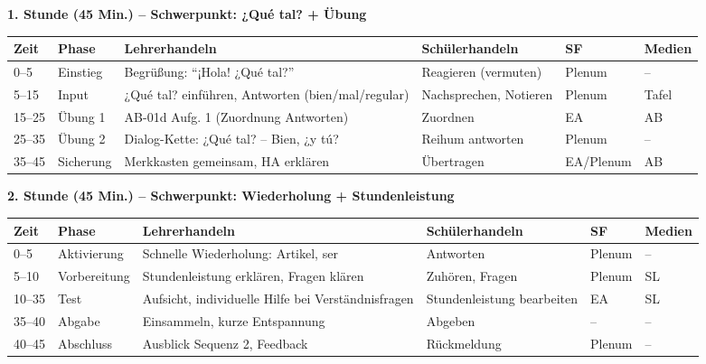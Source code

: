 \documentclass[11pt,a4paper]{article}
\begin{document}
\textbf{1. Stunde (45 Min.) -- Schwerpunkt: ¿Qué tal? + Übung}

\begin{longtable}{|p{1cm}|p{1.5cm}|p{4cm}|p{3cm}|p{2cm}|p{2cm}|}
\hline
\textbf{Zeit} & \textbf{Phase} & \textbf{Lehrerhandeln} & \textbf{Schülerhandeln} & \textbf{SF} & \textbf{Medien} \\
\hline
\endhead

0--5 & Einstieg & Begrüßung: ``¡Hola! ¿Qué tal?'' & Reagieren (vermuten) & Plenum & -- \\
\hline

5--15 & Input & ¿Qué tal? einführen, Antworten (bien/mal/regular) & Nachsprechen, Notieren & Plenum & Tafel \\
\hline

15--25 & Übung 1 & AB-01d Aufg. 1 (Zuordnung Antworten) & Zuordnen & EA & AB \\
\hline

25--35 & Übung 2 & Dialog-Kette: ¿Qué tal? -- Bien, ¿y tú? & Reihum antworten & Plenum & -- \\
\hline

35--45 & Sicherung & Merkkasten gemeinsam, HA erklären & Übertragen & EA/Plenum & AB \\
\hline
\end{longtable}

\vspace{1em}

\textbf{2. Stunde (45 Min.) -- Schwerpunkt: Wiederholung + Stundenleistung}

\begin{longtable}{|p{1cm}|p{1.5cm}|p{4cm}|p{3cm}|p{2cm}|p{2cm}|}
\hline
\textbf{Zeit} & \textbf{Phase} & \textbf{Lehrerhandeln} & \textbf{Schülerhandeln} & \textbf{SF} & \textbf{Medien} \\
\hline
\endhead

0--5 & Aktivierung & Schnelle Wiederholung: Artikel, ser & Antworten & Plenum & -- \\
\hline

5--10 & Vorbereitung & Stundenleistung erklären, Fragen klären & Zuhören, Fragen & Plenum & SL \\
\hline

10--35 & Test & Aufsicht, individuelle Hilfe bei Verständnisfragen & Stundenleistung bearbeiten & EA & SL \\
\hline

35--40 & Abgabe & Einsammeln, kurze Entspannung & Abgeben & -- & -- \\
\hline

40--45 & Abschluss & Ausblick Sequenz 2, Feedback & Rückmeldung & Plenum & -- \\
\hline
\end{longtable}
\end{document}
